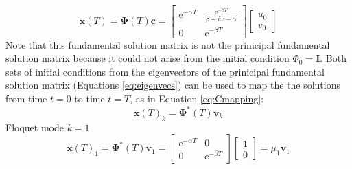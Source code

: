\documentclass{article}
\begin{document}
\begin{equation}
 \mathbf{x}(T)=\boldsymbol{\Phi}(T)\mathbf{c}=\begin{bmatrix*}
  \mathrm{e}^{-\alpha{T}} & \frac{\mathrm{e}^{-\beta T}}{\beta-i\omega-\alpha} \\
  0 & \mathrm{e}^{-\beta{T}}
 \end{bmatrix*}
 \begin{bmatrix*}
  u_0 \\
  v_0
 \end{bmatrix*}
 \label{eq:final_matrix}
\end{equation}
Note that this fundamental solution matrix is not the prinicipal fundamental solution matrix because 
it could not arise from the initial condition $\Phi_0=\mathbf{I}$. Both sets of initial conditions from 
the eigenvectors of the prinicipal fundamental solution matrix (Equations \ref{eq:eigenvecs}) can be used to map the 
the solutions from time $t=0$ to time $t=T$, as 
 in Equation \ref{eq:Cmapping}:
 \begin{equation}
  \mathbf{x}(T)_k=\boldsymbol{\Phi}^*(T)\mathbf{v}_k
 \end{equation}
Floquet mode $k=1$ %
 \begin{equation}
  \mathbf{x}(T)_1=\boldsymbol{\Phi}^*(T)\mathbf{v}_1=\begin{bmatrix*}
  \mathrm{e}^{-\alpha{T}} & 0 \\
  0 & \mathrm{e}^{-\beta{T}}
 \end{bmatrix*}
 \begin{bmatrix*}
  1 \\
  0 
 \end{bmatrix*}
 =\mu_1\mathbf{v}_1
 \end{equation}
\end{document}

